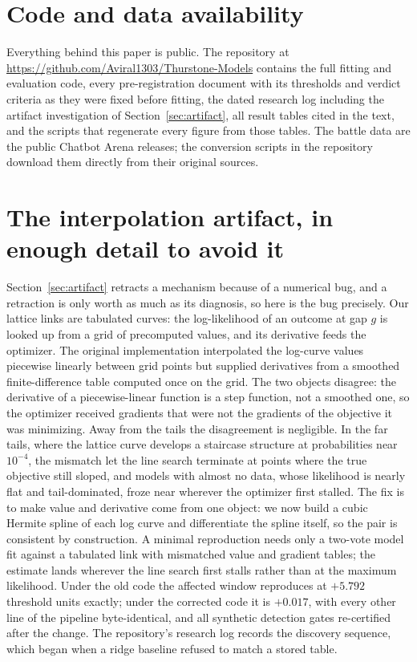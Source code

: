 \documentclass[10pt]{article}
\begin{document}
\section*{Code and data availability}

Everything behind this paper is public. The repository at
\url{https://github.com/Aviral1303/Thurstone-Models} contains the full
fitting and evaluation code, every pre-registration document with its
thresholds and verdict criteria as they were fixed before fitting, the
dated research log including the artifact investigation of
Section~\ref{sec:artifact}, all result tables cited in the text, and
the scripts that regenerate every figure from those tables. The battle
data are the public Chatbot Arena releases; the conversion scripts in
the repository download them directly from their original sources.



\appendix

\section{The interpolation artifact, in enough detail to avoid it}
\label{app:bug}

Section~\ref{sec:artifact} retracts a mechanism because of a numerical
bug, and a retraction is only worth as much as its diagnosis, so here
is the bug precisely. Our lattice links are tabulated curves: the
log-likelihood of an outcome at gap $g$ is looked up from a grid of
precomputed values, and its derivative feeds the optimizer. The
original implementation interpolated the log-curve values piecewise
linearly between grid points but supplied derivatives from a smoothed
finite-difference table computed once on the grid. The two objects
disagree: the derivative of a piecewise-linear function is a step
function, not a smoothed one, so the optimizer received gradients that
were not the gradients of the objective it was minimizing. Away from
the tails the disagreement is negligible. In the far tails, where the
lattice curve develops a staircase structure at probabilities near
$10^{-4}$, the mismatch let the line search terminate at points where
the true objective still sloped, and models with almost no data, whose
likelihood is nearly flat and tail-dominated, froze near wherever the
optimizer first stalled. The fix is to make value and derivative come
from one object: we now build a cubic Hermite spline of each log curve
and differentiate the spline itself, so the pair is consistent by
construction. A minimal reproduction needs only a two-vote model fit
against a tabulated link with mismatched value and gradient tables;
the estimate lands wherever the line search first stalls rather than
at the maximum likelihood. Under the old code the affected window
reproduces at $+5.792$ threshold units exactly; under the corrected
code it is $+0.017$, with every other line of the pipeline
byte-identical, and all synthetic detection gates re-certified after
the change. The repository's research log records the discovery
sequence, which began when a ridge baseline refused to match a stored
table.
\end{document}
